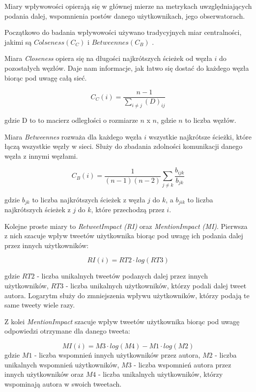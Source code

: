 \documentclass[polish,12pt]{aghthesis}
\begin{document}
Miary wpływowości opierają się w głównej mierze na metrykach uwzględniających podania dalej, wspomnienia postów danego użytkownikach, jego obserwatorach.

Początkowo do badania wpływowości używano tradycyjnych miar centralności, jakimi są $Colseness (C_C)$ i $Betweennes (C_B)$ \cite{closeness} \cite{betweenes}. 

Miara \textit{Closeness} opiera się na długości najkrótszych ścieżek od węzła $i$ do pozostałych węzłów. Daje nam informacje, jak łatwo się dostać do każdego węzła biorąc pod uwagę całą sieć. 

\begin{equation}
    C_C(i) = \frac{n-1}{\sum_{i \neq j}(D)_{ij}} \label{n6}
\end{equation}

gdzie D to to macierz odległości o rozmiarze $n$ x $n$, gdzie $n$ to liczba węzłów.

Miara \textit{Betweennes} rozważa dla każdego węzła $i$ wszystkie najkrótsze ścieżki, które łączą wszystkie węzły w sieci. Służy do zbadania zdolności komunikacji danego węzła z innymi węzłami. 

\begin{equation}
   C_B(i) = \frac{1}{(n-1)(n-2)}\sum_{j \neq k }\frac{b_{ijk}}{b_{jk}} \label{n7} 
\end{equation}

gdzie $b_{jk}$ to liczba najkrótszych ścieżek z węzła $j$ do $k$, a $b_{jik}$ to liczba najkrótszych ścieżek z  $j$ do $k$, które przechodzą przez $i$.


Kolejne proste miary to \textit{RetweetImpact (RI)} oraz \textit{MentionImpact (MI)}\cite{authority}. Pierwsza z nich szacuje wpływ tweetów użytkownika biorąc pod uwagę ich podania dalej przez innych użytkowników:

\begin{equation}
    RI(i) = RT2 \cdot log(RT3) \label{n8}
\end{equation}

gdzie $RT2$ - liczba unikalnych tweetów podanych dalej przez innych użytkowników, $RT3$ - liczba unikalnych użytkowników, którzy podali dalej tweet autora. Logarytm służy do zmniejszenia wpływu użytkowników, którzy podają te same tweety wiele razy. 

Z kolei \textit{MentionImpact} szacuje wpływ tweetów użytkownika biorąc pod uwagę odpowiedzi otrzymane dla danego tweeta:

\begin{equation}
    MI(i) = M3 \cdot log(M4) - M1 \cdot log(M2) \label{n9}
\end{equation}
gdzie $M1$ - liczba wspomnień innych użytkowników przez autora, $M2$ - liczba unikalnych wspomnień użytkowników, $M3$ - liczba wspomnień autora przez innych użytkowników oraz $M4$ - liczba unikalnych użytkowników, którzy wspominają autora w swoich tweetach.
\end{document}
